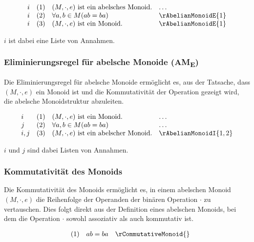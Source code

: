 \documentclass{book}
\theoremstyle{plain}
\theoremstyle{remark}
\theoremstyle{definition}
\begin{document}
\[
\begin{array}{llll}
    i       & (1) & (M, \cdot, e) \text{ ist ein abelsches Monoid.} & \dots \\
    i       & (2) & \forall a, b \in M (ab = ba) & \rAbelianMonoidE{1}\\
    i       & (3) & (M, \cdot, e) \text{ ist ein  Monoid.} & \rAbelianMonoidE{1}
\end{array}
\]

\(i\) ist dabei eine Liste von Annahmen.


\subsubsection*{Eliminierungsregel für abelsche Monoide (AM\textsubscript{E})}
\label{rule:rAbelianMonoidI}
Die Eliminierungsregel für abelsche Monoide ermöglicht es, aus der Tatsache, dass \((M, \cdot, e)\) ein Monoid ist und die Kommutativität der Operation gezeigt wird, die abelsche Monoidstruktur abzuleiten.

\[
\begin{array}{llll}
    i       & (1) & (M, \cdot, e) \text{ ist ein Monoid.} & \dots \\
    j       & (2) & \forall a, b \in M (ab = ba) & \dots \\
    i,j     & (3) & (M, \cdot, e) \text{ ist ein abelscher Monoid.} & \rAbelianMonoidI{1,2}
\end{array}
\]

\(i\) und \(j\) sind dabei Listen von Annahmen.

\subsubsection*{Kommutativität des Monoids}
\label{rule:rCommutativeMonoid}
Die Kommutativität des Monoids ermöglicht es, in einem abelschen Monoid \((M, \cdot, e)\) die Reihenfolge der Operanden der binären Operation \(\cdot\) zu vertauschen. Dies folgt direkt aus der Definition eines abelschen Monoids, bei dem die Operation \(\cdot\) sowohl assoziativ als auch kommutativ ist.


\[
\begin{array}{llll}
          & (1) & ab = ba & \rCommutativeMonoid{} \\
\end{array}
\]
\end{document}
